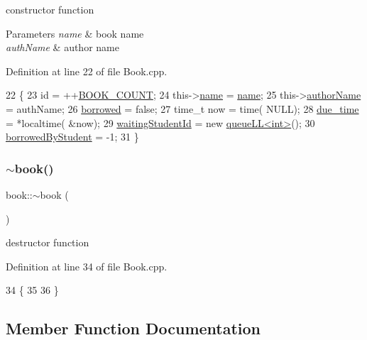 constructor function 
\begin{DoxyParams}{Parameters}
{\em name} & book name \\
\hline
{\em auth\+Name} & author name \\
\hline
\end{DoxyParams}


Definition at line 22 of file Book.\+cpp.


\begin{DoxyCode}
22                                              \{
23     \textcolor{keywordtype}{id} = ++\hyperlink{_book_8h_a84e48ab264903213f7f7a264da4e867d}{BOOK\_COUNT};
24     this->\hyperlink{classbook_a5eabc1c1c5abff26997bec3d41f90d9e}{name} = \hyperlink{classbook_a5eabc1c1c5abff26997bec3d41f90d9e}{name};
25     this->\hyperlink{classbook_a21b2962c6227818732db27f12121b732}{authorName} = authName;
26     \hyperlink{classbook_ab745520ed537e69bde6f2e3d7a103276}{borrowed} = \textcolor{keyword}{false};
27     time\_t now = time( NULL);
28     \hyperlink{classbook_abf72d9a32cdadee632df5a626dbe33b8}{due\_time} = *localtime( &now);
29     \hyperlink{classbook_a40ce04fcfbf99ffdbe7a4e1463588ee5}{waitingStudentId} = \textcolor{keyword}{new} \hyperlink{classqueue_l_l}{queueLL<int>}();
30     \hyperlink{classbook_afa5350900be6a34d8301a57d6db54df5}{borrowedByStudent} = -1;
31 \}
\end{DoxyCode}
\mbox{\label{classbook_a807e512df9551f568ed2b7bae11f3884}} 
\subsubsection{\texorpdfstring{$\sim$book()}{~book()}}
{\footnotesize\ttfamily book\+::$\sim$book (\begin{DoxyParamCaption}{ }\end{DoxyParamCaption})\hspace{0.3cm}{\ttfamily [virtual]}}

destructor function 

Definition at line 34 of file Book.\+cpp.


\begin{DoxyCode}
34             \{
35 
36 \}
\end{DoxyCode}


\subsection{Member Function Documentation}
\mbox{\label{classbook_a73dd64c834bd70d659ee456f3ef94c05}} 
